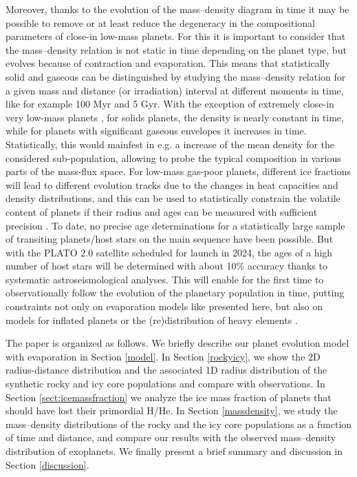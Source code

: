 \documentclass[]{emulateapj}
\begin{document}
Moreover, thanks to the evolution of the mass--density diagram in time it may be possible to remove or at least reduce the degeneracy in the compositional parameters of close-in low-mass planets. For this it is important to consider that the mass--density relation is not static in time depending on the planet type, but evolves because of contraction and evaporation. This means that statistically solid and gaseous can be distinguished by studying the mass--density relation for a given mass and distance (or irradiation) interval at different moments in time, like for example 100 Myr and 5 Gyr. With the exception of extremely close-in very low-mass planets \citep{perez2013}, for solids planets, the density is nearly constant in time, while for planets with significant gaseous envelopes it increases in time. Statistically, this would mainfest in e.g. a increase of the mean density for the considered sub-population, allowing to probe the typical composition in various parts of the mass-flux space. {For low-mass gas-poor planets, different ice fractions will lead to different evolution tracks due to the changes in heat capacities and density distributions, and this can be used to statistically constrain the volatile content of planets if their radius and ages can be measured with sufficient precision \citep{Alibert2016}}. To date, no precise age determinations for a statistically large sample of transiting planets/host stars on the main sequence have been possible. But with the PLATO 2.0 satellite \citep{Rauer2013} scheduled for launch in  2024, the ages of a high number of host stars will be determined with about 10\% accuracy thanks to systematic astroseismological analyses. This will enable for the first time to observationally follow the evolution of the planetary population in time, putting  constraints not only on evaporation models like presented here, but also on models for inflated planets \citep[e.g.,][]{Batygin2011} or the (re)distribution of heavy elements \citep[e.g.,][]{Vazan2013}.


The paper is organized as follows. We briefly describe our planet evolution model with evaporation in Section \ref{model}.  In Section \ref{rockyicy}, we show the 2D radius-distance distribution and the associated 1D radius distribution of the synthetic rocky and icy core populations and compare with observations. In Section \ref{sect:icemassfraction} we analyze the ice mass fraction of planets that should have lost their primordial H/He. In Section \ref{massdensity}, we study the mass--density distributions of the rocky and the icy core populations as a function of time and distance, and compare our results with the observed mass--density distribution of exoplanets. We finally present a brief summary and  discussion in Section \ref{discussion}. 
\end{document}
